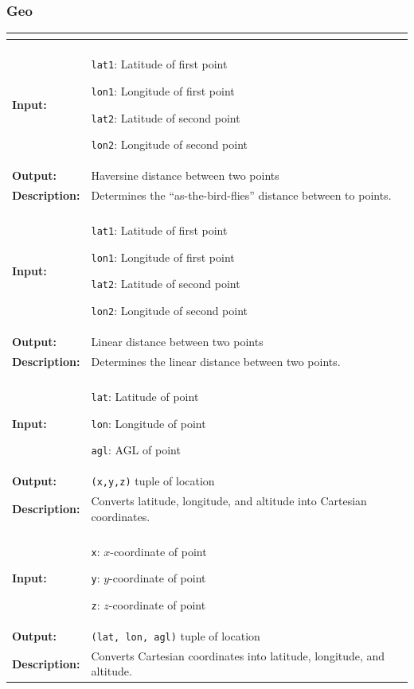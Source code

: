 \documentclass[titlepage]{article}
\renewenvironment{itemize*}
    {\begin{itemize}
        \setlength{\itemsep}{0pt}%
        \setlength{\parskip}{0pt}%
        \setlength{\partopsep}{0pt}%
        \setlength{\topsep}{0pt}}%
    {\end{itemize}}
\newcommand{\operations}[1]{
\begin{center}
    \begin{longtable}{|p{4cm}|p{10cm + 2.0\tabcolsep}|}
    \hline
    \multicolumn{2}{|l|}{\cellcolor[gray]{0.5}{\textbf{Operations}}} \\ \hline
#1
    \end{longtable}
\end{center}
}
\newcommand{\operation}[4]{
    \hline
    \multicolumn{2}{|l|}{\cellcolor[gray]{0.8}{\texttt{#1}}} \\ \hline
    \hspace{7pt}\textbf{Input:} & #2 \\ \hline
    \hspace{7pt}\textbf{Output:} & #3 \\ \hline
    \hspace{7pt}\textbf{Description:} & #4 \\ \hline
}
\begin{document}
\subsubsection{Geo}
\operations{
    \operation{haver\_distance(lat1, lon1, lat2, lon2)}
    {
        \begin{itemize*}
            \item \texttt{lat1}: Latitude of first point
            \item \texttt{lon1}: Longitude of first point
            \item \texttt{lat2}: Latitude of second point
            \item \texttt{lon2}: Longitude of second point
        \end{itemize*}
    }{Haversine distance between two points}{Determines the ``as-the-bird-flies'' distance between to points.}
    \operation{linear\_distance(lat1, lon1, lat2, lon2)}
    {
        \begin{itemize*}
            \item \texttt{lat1}: Latitude of first point
            \item \texttt{lon1}: Longitude of first point
            \item \texttt{lat2}: Latitude of second point
            \item \texttt{lon2}: Longitude of second point
        \end{itemize*}
    }{Linear distance between two points}{Determines the linear distance between two points.}
    \operation{sph\_to\_lin(lat, lon, agl)}
    {
        \begin{itemize*}
            \item \texttt{lat}: Latitude of point
            \item \texttt{lon}: Longitude of point
            \item \texttt{agl}: AGL of point
        \end{itemize*}
    }{\texttt{(x,y,z)} tuple of location}{Converts latitude, longitude, and altitude into Cartesian coordinates.}
    \operation{lin\_to\_sph(x, y, z)}
    {
        \begin{itemize*}
            \item \texttt{x}: $x$-coordinate of point
            \item \texttt{y}: $y$-coordinate of point
            \item \texttt{z}: $z$-coordinate of point
        \end{itemize*}
    }{\texttt{(lat, lon, agl)} tuple of location}{Converts Cartesian coordinates into latitude, longitude, and altitude.}
}
\end{document}
